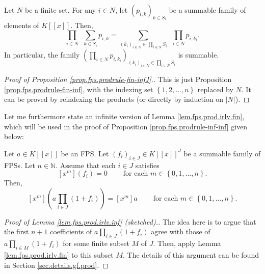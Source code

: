 \begin{proposition}
\label{prop.fps.prodrule-fin-infJ}Let $N$ be a finite set. For any $i\in N$,
let $\left(  p_{i,k}\right)  _{k\in S_{i}}$ be a summable family of elements
of $K\left[  \left[  x\right]  \right]  $. Then,%
\begin{equation}
\prod_{i\in N}\ \ \sum_{k\in S_{i}}p_{i,k}=\sum_{\left(  k_{i}\right)  _{i\in
N}\in\prod_{i\in N}S_{i}}\ \ \prod_{i\in N}p_{i,k_{i}}.
\label{eq.lem.fps.prodrule-fin-infJ.eq}%
\end{equation}
In particular, the family $\left(  \prod_{i\in N}p_{i,k_{i}}\right)  _{\left(
k_{i}\right)  _{i\in N}\in\prod_{i\in N}S_{i}}$ is summable.
\end{proposition}

\begin{proof}
[Proof of Proposition \ref{prop.fps.prodrule-fin-infJ}.]This is just
Proposition \ref{prop.fps.prodrule-fin-inf}, with the indexing set $\left\{
1,2,\ldots,n\right\}  $ replaced by $N$. It can be proved by reindexing the
products (or directly by induction on $\left\vert N\right\vert $).
\end{proof}

Let me furthermore state an infinite version of Lemma
\ref{lem.fps.prod.irlv.fin}, which will be used in the proof of Proposition
\ref{prop.fps.prodrule-inf-inf} given below:

\begin{lemma}
\label{lem.fps.prod.irlv.inf}Let $a\in K\left[  \left[  x\right]  \right]  $
be an FPS. Let $\left(  f_{i}\right)  _{i\in J}\in K\left[  \left[  x\right]
\right]  ^{J}$ be a summable family of FPSs. Let $n\in\mathbb{N}$. Assume that
each $i\in J$ satisfies
\begin{equation}
\left[  x^{m}\right]  \left(  f_{i}\right)  =0\ \ \ \ \ \ \ \ \ \ \text{for
each }m\in\left\{  0,1,\ldots,n\right\}  .
\label{eq.lem.fps.prod.irlv.inf.ass}%
\end{equation}
Then,
\[
\left[  x^{m}\right]  \left(  a\prod_{i\in J}\left(  1+f_{i}\right)  \right)
=\left[  x^{m}\right]  a\ \ \ \ \ \ \ \ \ \ \text{for each }m\in\left\{
0,1,\ldots,n\right\}  .
\]

\end{lemma}

\begin{proof}
[Proof of Lemma \ref{lem.fps.prod.irlv.inf} (sketched).]The idea here is to
argue that the first $n+1$ coefficients of $a\prod_{i\in J}\left(
1+f_{i}\right)  $ agree with those of $a\prod_{i\in M}\left(  1+f_{i}\right)
$ for some finite subset $M$ of $J$. Then, apply Lemma
\ref{lem.fps.prod.irlv.fin} to this subset $M$. The details of this argument
can be found in Section \ref{sec.details.gf.prod}.
\end{proof}


